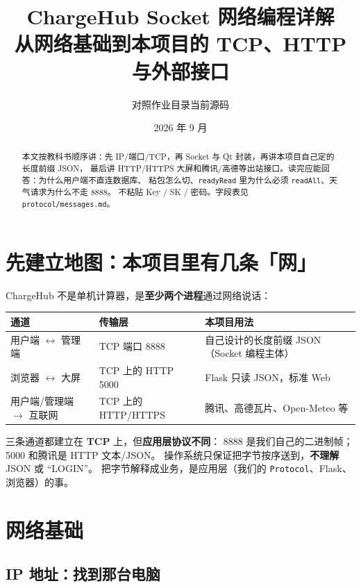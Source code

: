 \documentclass[UTF8,a4paper,11pt]{ctexart}
\title{ChargeHub Socket 网络编程详解\\[0.35em]
\large 从网络基础到本项目的 TCP、HTTP 与外部接口}
\author{对照作业目录当前源码}
\date{2026 年 9 月}
\begin{document}
\maketitle

\begin{abstract}
\noindent
本文按教科书顺序讲：先 IP/端口/TCP，再 Socket 与 Qt 封装，再讲本项目自己定的长度前缀 JSON，
最后讲 HTTP/HTTPS 大屏和腾讯/高德等出站接口。读完应能回答：为什么用户端不直连数据库、
粘包怎么切、\texttt{readyRead} 里为什么必须 \texttt{readAll}、天气请求为什么不走 8888。
不粘贴 Key / SK / 密码。字段表见 \texttt{protocol/messages.md}。
\end{abstract}

\tableofcontents
\newpage

\section{先建立地图：本项目里有几条「网」}

ChargeHub 不是单机计算器，是\textbf{至少两个进程}通过网络说话：

\begin{center}
\begin{tabular}{lll}
\toprule
通道 & 传输层 & 本项目用法 \\
\midrule
用户端 $\leftrightarrow$ 管理端 & TCP 端口 8888 & 自己设计的长度前缀 JSON（Socket 编程主体） \\
浏览器 $\leftrightarrow$ 大屏 & TCP 上的 HTTP 5000 & Flask 只读 JSON，标准 Web \\
用户端/管理端 $\to$ 互联网 & TCP 上的 HTTP/HTTPS & 腾讯、高德瓦片、Open-Meteo 等 \\
\bottomrule
\end{tabular}
\end{center}

三条通道都建立在 \textbf{TCP} 上，但\textbf{应用层协议不同}：
8888 是我们自己的二进制帧；5000 和腾讯是 HTTP 文本/JSON。
操作系统只保证把字节按序送到，\textbf{不理解} JSON 或 ``LOGIN''。
把字节解释成业务，是应用层（我们的 \texttt{Protocol}、Flask、浏览器）的事。

\section{网络基础}

\subsection{IP 地址：找到那台电脑}
\end{document}
